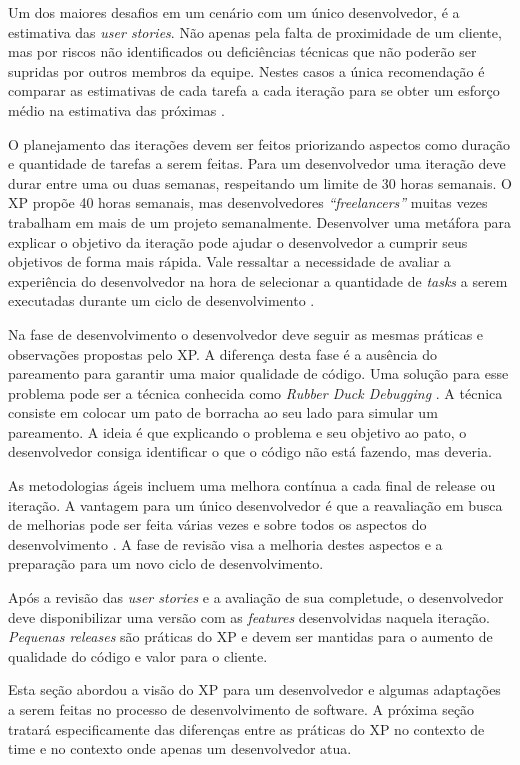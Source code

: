 Um dos maiores desafios em um cenário com um único desenvolvedor, é a estimativa das \textit{user stories}. Não apenas pela falta de proximidade de um cliente, mas por riscos não identificados ou deficiências técnicas que não poderão ser supridas por outros membros da equipe. Nestes casos a única recomendação é comparar as estimativas de cada tarefa a cada iteração para se obter um esforço médio na estimativa das próximas \cite{Bernabe:2015}.

O planejamento das iterações devem ser feitos priorizando aspectos como duração e quantidade de tarefas a serem feitas. Para um desenvolvedor uma iteração deve durar entre uma ou duas semanas, respeitando um limite de 30 horas semanais. O XP propõe 40 horas semanais, mas desenvolvedores \textit{“freelancers”} muitas vezes trabalham em mais de um projeto semanalmente. Desenvolver uma metáfora para explicar o objetivo da iteração pode ajudar o desenvolvedor a cumprir seus objetivos de forma mais rápida. Vale ressaltar a necessidade de avaliar a experiência do desenvolvedor na hora de selecionar a quantidade de \textit{tasks} a serem executadas durante um ciclo de desenvolvimento \cite{Bernabe:2015}.

Na fase de desenvolvimento o desenvolvedor deve seguir as mesmas práticas e observações propostas pelo XP. A diferença desta fase é a ausência do pareamento para garantir uma maior qualidade de código. Uma solução para esse problema pode ser a técnica conhecida como \textit{Rubber Duck Debugging} \cite{Andrew:2002}. A técnica consiste em colocar um pato de borracha ao seu lado para simular um pareamento. A ideia é que explicando o problema e seu objetivo ao pato, o desenvolvedor consiga identificar o que o código não está fazendo, mas deveria.

As metodologias ágeis incluem uma melhora contínua a cada final de release ou iteração. A vantagem para um único desenvolvedor é que a reavaliação em busca de melhorias pode ser feita várias vezes e sobre todos os aspectos do desenvolvimento \cite{Bernabe:2015}.  A fase de revisão visa a melhoria destes aspectos e a preparação para um novo ciclo de desenvolvimento.

Após a revisão das \textit{user stories} e a avaliação de sua completude, o desenvolvedor deve disponibilizar uma versão com as \textit{features} desenvolvidas naquela iteração. \textit{Pequenas releases} são práticas do XP e devem ser mantidas para o aumento de qualidade do código e valor para o cliente.

Esta seção abordou a visão do XP para um desenvolvedor e algumas adaptações a serem feitas no processo de desenvolvimento de software. A próxima seção tratará especificamente das diferenças entre as práticas do XP no contexto de time e no contexto onde apenas um desenvolvedor atua.

